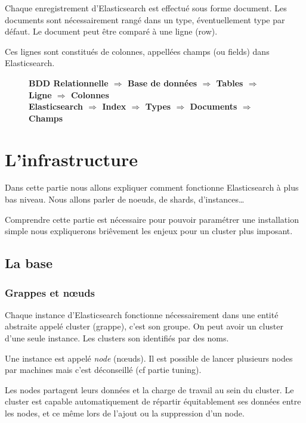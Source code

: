 Chaque enregistrement d'Elasticsearch est effectué sous forme document. Les documents
sont nécessairement rangé dans un type, éventuellement type par défaut. Le document 
peut être comparé à une ligne (row). 

Ces lignes sont constitués de colonnes, appellées champs (ou fields) dans Elasticsearch.

\begin{figure}[H]
\textbf{BDD Relationnelle $\Rightarrow$ Base de données $\Rightarrow$ Tables $\Rightarrow$ Ligne $\Rightarrow$ Colonnes\\
Elasticsearch \hspace{7mm} $\Rightarrow$ \hspace{8mm }Index \hspace{8mm} $\Rightarrow$ \hspace{3mm}Types \hspace{3mm} $\Rightarrow$ Documents $\Rightarrow$ Champs}
\end{figure}


\section{L'infrastructure}
Dans cette partie nous allons expliquer comment fonctionne Elasticsearch à plus bas 
niveau. Nous allons parler de noeuds, de shards, d'instances\ldots

Comprendre cette partie est nécessaire pour pouvoir paramétrer une installation simple 
nous expliquerons briêvement les enjeux pour un cluster plus imposant.
\subsection{La base}
\subsubsection{Grappes et nœuds}
Chaque instance d'Elasticsearch fonctionne nécessairement dans une entité abstraite 
appelé cluster (grappe), c'est son groupe. On peut avoir un cluster d'une seule instance.
Les clusters son identifiés par des noms.

Une instance est appelé \emph{node} (nœuds). Il est possible de lancer plusieurs nodes  
par machines mais c'est déconseillé (cf partie tuning).

Les nodes partagent leurs données et la charge de travail au sein du cluster. Le 
cluster est capable automatiquement de répartir équitablement ses données entre 
les nodes, et ce même lors de l'ajout ou la suppression d'un node.

